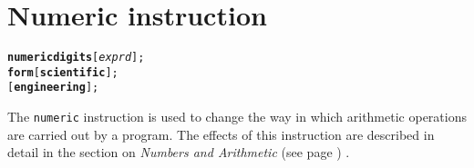 \chapter{Numeric instruction}\label{"id"}
\index{,}
\begin{shaded}
\begin{alltt}
\textbf{numeric digits} [\emph{exprd}];
                \textbf{form} [\textbf{scientific}];
                          [\textbf{engineering}];
\end{alltt}
\end{shaded}
 The \texttt{numeric} instruction is used to change the way in which
arithmetic operations are carried out by a program.
The effects of this instruction are described in detail in the
section on  \emph{Numbers and Arithmetic} (see page \pageref{refnums}) .
